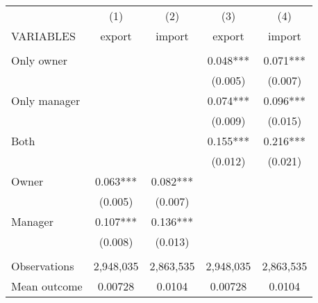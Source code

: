 \begin{tabular}{lcccc} \hline
 & (1) & (2) & (3) & (4) \\
VARIABLES & export & import & export & import \\ \hline
 &  &  &  &  \\
Only owner &  &  & 0.048*** & 0.071*** \\
 &  &  & (0.005) & (0.007) \\
Only manager &  &  & 0.074*** & 0.096*** \\
 &  &  & (0.009) & (0.015) \\
Both &  &  & 0.155*** & 0.216*** \\
 &  &  & (0.012) & (0.021) \\
Owner & 0.063*** & 0.082*** &  &  \\
 & (0.005) & (0.007) &  &  \\
Manager & 0.107*** & 0.136*** &  &  \\
 & (0.008) & (0.013) &  &  \\
 &  &  &  &  \\
Observations & 2,948,035 & 2,863,535 & 2,948,035 & 2,863,535 \\
 Mean outcome & 0.00728 & 0.0104 & 0.00728 & 0.0104 \\ \hline
\end{tabular}
